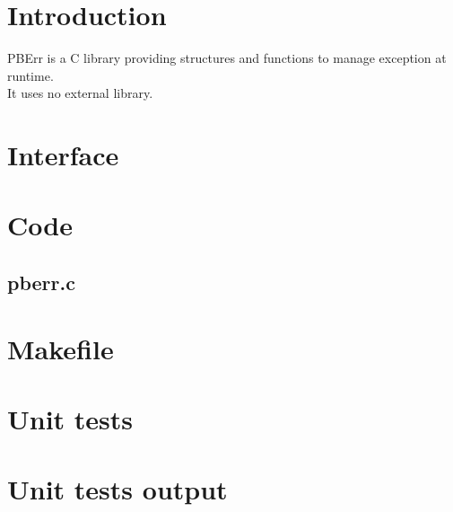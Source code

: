 \section*{Introduction}

PBErr is a C library providing structures and functions to manage exception at runtime.\\ 

It uses no external library.\\

\section{Interface}

\begin{scriptsize}
\begin{ttfamily}

\end{ttfamily}
\end{scriptsize}

\section{Code}

\subsection{pberr.c}

\begin{scriptsize}
\begin{ttfamily}

\end{ttfamily}
\end{scriptsize}

\section{Makefile}

\begin{scriptsize}
\begin{ttfamily}

\end{ttfamily}
\end{scriptsize}

\section{Unit tests}

\begin{scriptsize}
\begin{ttfamily}

\end{ttfamily}
\end{scriptsize}

\section{Unit tests output}

\begin{scriptsize}
\begin{ttfamily}

\end{ttfamily}
\end{scriptsize}


